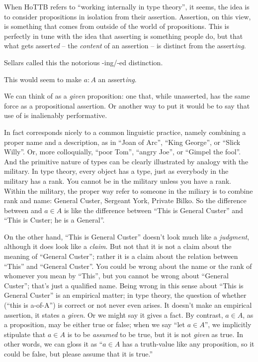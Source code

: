 When HoTTB refers to ``working internally in type theory'', it seems,
the idea is to consider propositions in isolation from their
assertion.  Assertion, on this view, is something that comes from
outside of the world of propositions.  This is perfectly in tune with
the idea that asserting is something people do, but that what gets
assert\textit{ed} -- the \textit{content} of an assertion -- is
distinct from the assert\textit{ing}.

\begin{remark}
  Sellars called this the notorious -ing/-ed distinction.
\end{remark}

This would seem to make \(a : A\) an assert\textit{ing}.

We can think of \atypeA{} as a \textit{given} proposition: one that,
while unasserted, has the same force as a propositional assertion.  Or
another way to put it would be to say that use of \atypeA{} is
inalienably performative.

In fact \atypeA{} corresponds nicely to a common linguistic practice,
namely combining a proper name and a description, as in ``Joan of
Arc'', ``King George'', or ``Slick Willy''.  Or, more colloquially,
``poor Tom'', ``angry Joe'', or ``Gimpel the fool''.  And the
primitive nature of types can be clearly illustrated by analogy with
the military.  In type theory, every object has a type, just as
everybody in the military has a rank.  You cannot be in the military
unless you have a rank.  Within the military, the proper way refer to
someone in the miliary is to combine rank and name: General Custer,
Sergeant York, Private Bilko.  So the difference between \atypeA{} and
\(a\in A\) is like the difference between ``This is General Custer''
and ``This is Custer; he is a General''.

On the other hand, ``This is General Custer'' doesn't look much like a
\textit{judgment}, although it does look like a \textit{claim}.  But
not that it is not a claim about the meaning of ``General Custer'';
rather it is a claim about the relation between ``This'' and ``General
Custer''.  You could be wrong about the name or the rank of whomever
you mean by ``This'', but you cannot be wrong about ``General
Custer''; that's just a qualified name.  Being wrong in this sense
about ``This is General Custer'' is an empirical matter; in type
theory, the question of whether \atypeA (``this is a-of-A'') is
correct or not never even arises.  It doesn't make an empirical
assertion, it states a \textit{given}.  Or we might say it gives a
fact.  By contrast, \(a\in A\), as a proposition, may be either true
or false; when we say ``let \(a\in A\)'', we implicitly stipulate that
\(a\in A\) is to be \textit{assumed} to be true, but it is not
\textit{given} as true.  In other words, we can gloss it as ``\(a\in
A\) has a truth-value like any proposition, so it could be false, but
please assume that it is true.''

